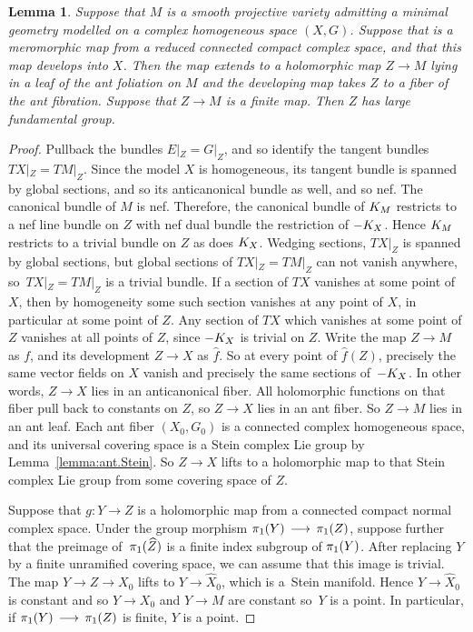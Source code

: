 \documentclass[11pt]{article}
\numberwithin{equation}{section}
\numberwithin{equation}{section}
\newtheorem{Lemma}[Theorem]{Lemma}
\begin{document}
\begin{Lemma}\label{lemma:dev.large}
Suppose that $M$ is a smooth projective variety admitting a minimal geometry modelled on a complex homogeneous space $(X, G)$.
Suppose that  is a meromorphic map from a reduced connected compact complex space, and that this map develops into $X$.
Then the map extends to a holomorphic map $Z \to M$ lying in a leaf of the ant foliation on $M$ and the developing map takes $Z$ to a fiber of the ant fibration.
Suppose that $Z \to M$ is a finite map.
Then $Z$ has large fundamental group.
\end{Lemma}

\begin{proof}
Pullback the bundles $E|_Z = G|_Z$, and so identify the tangent bundles $ TX|_Z= TM|_Z$.
Since the model $X$ is homogeneous, its tangent bundle is spanned by global sections, and so its anticanonical bundle as well, and so nef.
The canonical bundle of $M$ is nef.
Therefore, the canonical bundle of $\cb{M}$ restricts to a nef line bundle on $Z$ with nef dual bundle the restriction of $\acb{X}$.
Hence $\cb{M}$ restricts to a trivial bundle on $Z$ as does $\cb{X}$.
Wedging sections, $ TX|_Z$ is spanned by global sections, but global sections of $ TX|_Z= TM|_Z$ can not vanish anywhere, so~${TX|_Z= TM|_Z}$ is a trivial bundle.
If a section of $TX$ vanishes at some point of $X$, then by homogeneity some such section vanishes at any point of $X$, in particular at some point of $Z$.
Any section of $TX$ which vanishes at some point of $Z$ vanishes at all points of $Z$, since $\acb{X}$ is trivial on $Z$.
Write the map $Z \to M$ as $f$, and its development $Z \to X$ as $\widehat{f}$.
So at every point of $\widehat{f}(Z)$, precisely the same vector fields on $X$ vanish and precisely the same sections of~$\acb{X}$.
In other words, $Z \to X$ lies in an anticanonical fiber.
All holomorphic functions on that fiber pull back to constants on $Z$, so $Z \to X$ lies in an ant fiber.
So $Z \to M$ lies in an ant leaf.
Each ant fiber $(X_0, G_0)$ is a connected complex homogeneous space, and its universal covering space is a Stein complex Lie group by
Lemma~\ref{lemma:ant.Stein}.
So $Z \to X$ lifts to a holomorphic map to that Stein complex Lie group from some covering space of $Z$.

Suppose that $g \colon Y \to Z$ is a holomorphic map from a connected compact normal complex space.
Under the group morphism $\pi_{1}({Y}) \,\longrightarrow\, \pi_{1}({Z})$, suppose further that the preimage of~$\pi_{1}({\widehat{Z}})$ is a finite index subgroup of $\pi_{1}({Y})$.
After replacing $Y$ by a finite unramified covering space, we can assume that this image is trivial.
The map $Y \to Z \to X_0$ lifts to $Y \to \widehat{X}_0$, which is a~Stein manifold.
Hence $Y \to \widehat{X}_0$ is constant and so $Y \to X_0$ and $Y \to M$ are constant so~$Y$ is a point.
In particular, if $\pi_{1}({Y}) \,\longrightarrow\, \pi_{1}({Z})$ is finite, $Y$ is a point.
\end{proof}
\end{document}
